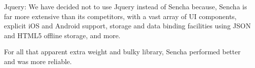 Jquery: We have decided not to use Jquery instead of Sencha because, Sencha is far more extensive than its competitors, with a vast array of UI    
components, explicit iOS and Android support, storage and data binding facilities using JSON and HTML5 offline storage, and more.

For all that apparent extra weight and bulky library, Sencha performed better and was more reliable.

